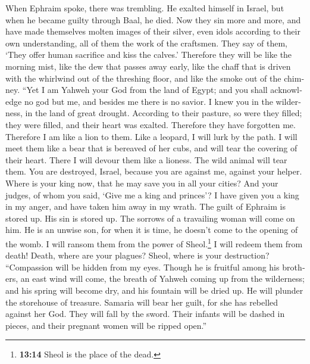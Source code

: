 \begin{paracol}{2}
\begin{otherlanguage}{english}
 When Ephraim spoke, there was trembling. He exalted
himself in Israel, but when he became guilty through Baal, he died.
 Now they sin more and more, and have made themselves
molten images of their silver, even idols according to their own
understanding, all of them the work of the craftsmen. They say of them,
`They offer human sacrifice and kiss the calves.' 
Therefore they will be like the morning mist, like the dew that passes
away early, like the chaff that is driven with the whirlwind out of the
threshing floor, and like the smoke out of the chimney. 
``Yet I am Yahweh your God from the land of Egypt; and you shall
acknowledge no god but me, and besides me there is no savior.
 I knew you in the wilderness, in the land of great
drought.  According to their pasture, so were they filled;
they were filled, and their heart was exalted. Therefore they have
forgotten me.  Therefore I am like a lion to them. Like a
leopard, I will lurk by the path.  I will meet them like a
bear that is bereaved of her cubs, and will tear the covering of their
heart. There I will devour them like a lioness. The wild animal will
tear them.  You are destroyed, Israel, because you are
against me, against your helper.  Where is your king now,
that he may save you in all your cities? And your judges, of whom you
said, `Give me a king and princes'?  I have given you a
king in my anger, and have taken him away in my wrath. 
The guilt of Ephraim is stored up. His sin is stored up. 
The sorrows of a travailing woman will come on him. He is an unwise son,
for when it is time, he doesn't come to the opening of the womb.
 I will ransom them from the power of Sheol.\footnote{\textbf{13:14}
  Sheol is the place of the dead.} I will redeem them from death! Death,
where are your plagues? Sheol, where is your destruction? ``Compassion
will be hidden from my eyes.  Though he is fruitful among
his brothers, an east wind will come, the breath of Yahweh coming up
from the wilderness; and his spring will become dry, and his fountain
will be dried up. He will plunder the storehouse of treasure.
 Samaria will bear her guilt, for she has rebelled
against her God. They will fall by the sword. Their infants will be
dashed in pieces, and their pregnant women will be ripped open.''

\end{otherlanguage}


\end{paracol}
